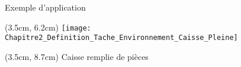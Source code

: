\documentclass[french]{beamer}
\begin{document}
\begin{frame}{Exemple d'application}
{\begin{textblock*}{2.75cm}(3.5cm, 6.2cm)
\centering
\texttt{[image: Chapitre2\_Definition\_Tache\_Environnement\_Caisse\_Pleine]}
\end{textblock*}
\begin{textblock*}{2.75cm}(3.5cm, 8.7cm)
\centering
\tiny{Caisse remplie de pièces}\\
\end{textblock*}
}

\end{frame}


%

\end{document}
